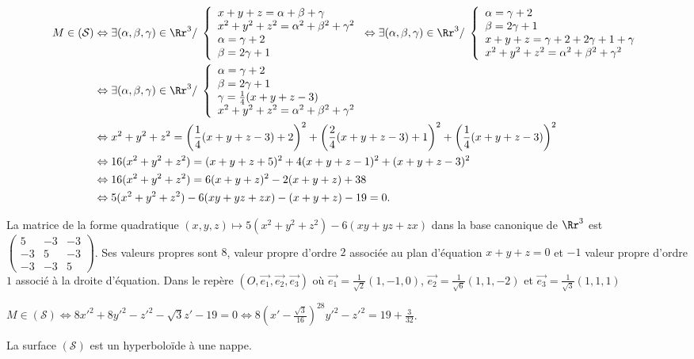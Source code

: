 {{\begin{align*}
M\in(\mathcal{S})&\Leftrightarrow\exists(\alpha,\beta,\gamma)\in\Rr^3/\;\left\{
\begin{array}{l}
x+y+z=\alpha+\beta+\gamma\\
x^2+y^2+z^2=\alpha^2+\beta^2+\gamma^2\\
\alpha=\gamma+2\\
\beta=2\gamma+1
\end{array}
\right.\Leftrightarrow\exists(\alpha,\beta,\gamma)\in\Rr^3/\;\left\{
\begin{array}{l}
\alpha=\gamma+2\\
\beta=2\gamma+1\\
x+y+z=\gamma+2+2\gamma+1+\gamma\\
x^2+y^2+z^2=\alpha^2+\beta^2+\gamma^2
\end{array}
\right. \\
&\Leftrightarrow\exists(\alpha,\beta,\gamma)\in\Rr^3/\;\left\{
\begin{array}{l}
\alpha=\gamma+2\\
\beta=2\gamma+1\\
\gamma=\frac{1}{4}(x+y+z-3)\\
x^2+y^2+z^2=\alpha^2+\beta^2+\gamma^2
\end{array}
\right.\\
 &\Leftrightarrow x^2+y^2+z^2 =\left(\frac{1}{4}(x+y+z-3)+2\right)^2 +\left(\frac{2}{4}(x+y+z-3)+1\right)^2 +\left(\frac{1}{4}(x+y+z-3)\right)^2\\
 &\Leftrightarrow16(x^2+y^2+z^2) =(x+y+z+5)^2+4(x+y+z-1)^2+(x+y+z-3)^2 \\
 &\Leftrightarrow16(x^2+y^2+z^2) = 6(x+y+z)^2-2(x+y+z) + 38\\
 &\Leftrightarrow5(x^2+y^2+z^2) -6(xy+yz+zx)-(x+y+z)-19 = 0.
\end{align*}

\begin{center}
\end{center}

La matrice de la forme quadratique $(x,y,z)\mapsto5(x^2+y^2+z^2) -6(xy+yz+zx)$ dans la base canonique de $\Rr^3$ est $\left(
\begin{array}{ccc}
5&-3&-3\\
-3&5&-3\\
-3&-3&5
\end{array}
\right)$. Ses valeurs propres sont $8$, valeur propre d'ordre $2$ associée au plan d'équation $x+y+z=0$ et $-1$ valeur propre d'ordre $1$ associé à la droite d'équation. Dans le repère $\left(O,\overrightarrow{e_1},\overrightarrow{e_2},\overrightarrow{e_3}\right)$ où $\overrightarrow{e_1}=\frac{1}{\sqrt{2}}(1,-1,0)$, $\overrightarrow{e_2}=\frac{1}{\sqrt{6}}(1,1,-2)$ et $\overrightarrow{e_3}=\frac{1}{\sqrt{3}}(1,1,1)$ 

\begin{center}
$M\in(\mathcal{S})\Leftrightarrow8x'^2+8y'^2-z'^2-\sqrt{3}z'-19=0\Leftrightarrow8\left(x'-\frac{\sqrt{3}}{16}\right)^28y'^2-z'^2=19+\frac{3}{32}$.
\end{center}

La surface $(\mathcal{S})$ est un hyperboloïde à une nappe.
}
}
